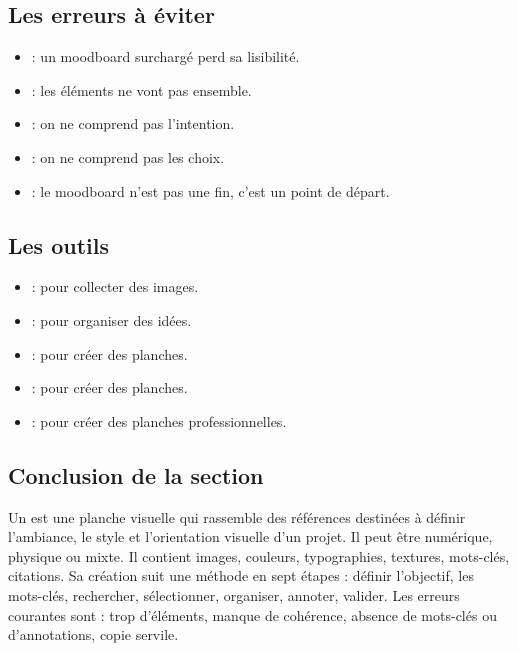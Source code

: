 \subsection{Les erreurs à éviter}

\begin{itemize}
    \item {} : un moodboard surchargé perd sa lisibilité.
    \item {} : les éléments ne vont pas ensemble.
    \item {} : on ne comprend pas l'intention.
    \item {} : on ne comprend pas les choix.
    \item {} : le moodboard n'est pas une fin, c'est un point de départ.
\end{itemize}

\subsection{Les outils}

\begin{itemize}
    \item {} : pour collecter des images.
    \item {} : pour organiser des idées.
    \item {} : pour créer des planches.
    \item {} : pour créer des planches.
    \item {} : pour créer des planches professionnelles.
\end{itemize}

\subsection*{Conclusion de la section}

\begin{retenir}
Un  est une planche visuelle qui rassemble des références destinées à définir l'ambiance, le style et l'orientation visuelle d'un projet. Il peut être numérique, physique ou mixte. Il contient images, couleurs, typographies, textures, mots-clés, citations. Sa création suit une méthode en sept étapes : définir l'objectif, les mots-clés, rechercher, sélectionner, organiser, annoter, valider. Les erreurs courantes sont : trop d'éléments, manque de cohérence, absence de mots-clés ou d'annotations, copie servile.
\end{retenir}

